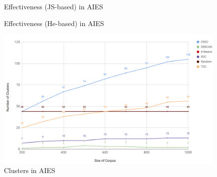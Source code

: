 \begin{figure}[!htb]\centering
   \begin{minipage}{0.49\textwidth}
     \caption{Effectiveness (JS-based) in AIES}\label{fig:effectivenessJS}
   \end{minipage}
   \begin {minipage}[c]{0.49\textwidth}
     \caption{Effectiveness (He-based) in AIES}\label{fig:effectivenessHe}
   \end{minipage}
\end{figure}

\begin{figure}\centering
  \center
  \includegraphics[scale=0.50]{clusters.png}
  \caption{Clusters in AIES}
  \label{fig:clusters}
\end{figure}

